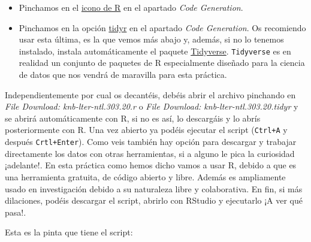 \documentclass[
]{book}
\newcommand{\passthrough}[1]{#1}
\providecommand{\tightlist}{%
  \setlength{\itemsep}{0pt}\setlength{\parskip}{0pt}}
\begin{document}
\begin{itemize}
\tightlist
\item
  Pinchamos en el \href{https://portal.edirepository.org/nis/codeGeneration?packageId=knb-lter-ntl.117.38\&statisticalFileType=r}{icono de R} en el apartado \emph{Code Generation}.
\item
  Pinchamos en la opción \href{https://portal.edirepository.org/nis/codeGeneration?packageId=knb-lter-ntl.303.20\&statisticalFileType=tidyr}{tidyr} en el apartado \emph{Code Generation}. Os recomiendo usar esta última, es la que vemos más abajo y, además, si no lo tenemos instalado, instala automáticamente el paquete \href{https://www.tidyverse.org/}{Tidyverse}. \passthrough{\lstinline!Tidyverse!} es en realidad un conjunto de paquetes de R especialmente diseñado para la ciencia de datos que nos vendrá de maravilla para esta práctica.
\end{itemize}

Independientemente por cual os decantéis, debéis abrir el archivo pinchando en \emph{File Download: knb-lter-ntl.303.20.r} o \emph{File Download: knb-lter-ntl.303.20.tidyr} y se abrirá automáticamente con R, si no es así, lo descargáis y lo abrís posteriormente con R. Una vez abierto ya podéis ejecutar el script (\passthrough{\lstinline!Ctrl+A!} y después \passthrough{\lstinline!Crtl+Enter!}).
Como veis también hay opción para descargar y trabajar directamente los datos con otras herramientas, si a alguno le pica la curiosidad ¡adelante!. En esta práctica como hemos dicho vamos a usar R, debido a que es una herramienta gratuita, de código abierto y libre. Además es ampliamente usado en investigación debido a su naturaleza libre y colaborativa. En fin, si más dilaciones, podéis descargar el script, abrirlo con RStudio y ejecutarlo ¡A ver qué pasa!.

Esta es la pinta que tiene el script:
\end{document}
